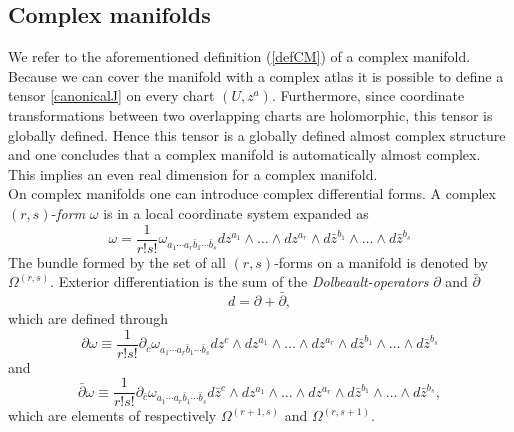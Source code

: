 \documentclass[12pt,twoside]{book}
\begin{document}
\subsection{Complex manifolds}

We refer to the aforementioned definition (\ref{defCM}) of a complex manifold. Because we can cover the manifold with a complex atlas it is possible to define a tensor \eqref{canonicalJ} on every chart $(U,z^{a})$. Furthermore, since coordinate transformations between two overlapping charts are holomorphic, this tensor is globally defined. Hence this tensor is a globally defined almost complex structure and one concludes that a complex manifold is automatically almost complex. This implies an even real dimension for a complex manifold.\\

On complex manifolds one can introduce complex differential forms. A complex $(r,s)$-\emph{form} $\omega$ is in a local coordinate system expanded as
\begin{equation}
\omega = \frac{1}{r!s!}\omega_{a_{1}\cdots a_{r}\bar{b}_{1}\cdots \bar{b}_{s}}dz^{a_{1}}\wedge \ldots\wedge dz^{a_{r}}
\wedge d\bar{z}^{b_{1}}\wedge \ldots \wedge d\bar{z}^{b_{s}}
\end{equation}
The bundle formed by the set of all $(r,s)$-forms on a manifold is denoted by $\Omega^{(r,s)}$. Exterior differentiation is the sum of the \emph{Dolbeault-operators} $\partial$ and $\bar{\partial}$
\begin{equation}
d = \partial + \bar{\partial},
\end{equation}
which are defined through
\begin{equation}
\partial \omega \equiv \frac{1}{r!s!} \partial_{c} \omega_{a_{1}\cdots a_{r}\bar{b}_{1}
\cdots \bar{b}_{s}} dz^{c} \wedge dz^{a_{1}}\wedge \ldots\wedge dz^{a_{r}}
\wedge d\bar{z}^{b_{1}}\wedge \ldots \wedge d\bar{z}^{b_{s}}
\end{equation}
and
\begin{equation}
\bar{\partial} \omega \equiv \frac{1}{r!s!} \partial_{\bar{c}} \omega_{a_{1}\cdots a_{r}\bar{b}_{1}\cdots \bar{b}_{s}}
d\bar{z}^{c}\wedge dz^{a_{1}}\wedge \ldots\wedge dz^{a_{r}} \wedge d\bar{z}^{b_{1}}\wedge \ldots \wedge d\bar{z}^{b_{s}},
\end{equation}
which are elements of respectively $\Omega^{(r+1,s)}$ and $\Omega^{(r,s+1)}$.\newline
\end{document}
